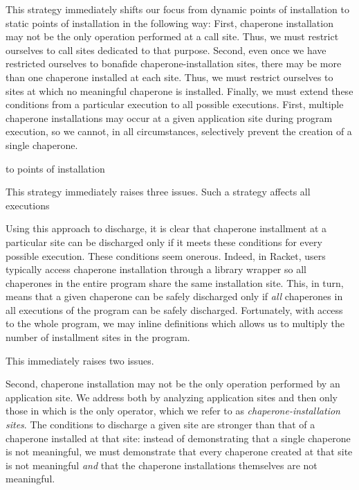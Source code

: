This strategy immediately shifts our focus from dynamic points of installation to static points of installation in the following way:
First, chaperone installation may not be the only operation performed at a call site.
Thus, we must restrict ourselves to call sites dedicated to that purpose.
Second, even once we have restricted ourselves to bonafide chaperone-installation sites, there may be more than one chaperone installed at each site.
Thus, we must restrict ourselves to sites at which no meaningful chaperone is installed.
Finally, we must extend these conditions from a particular execution to all possible executions.
First, multiple chaperone installations may occur at a given application site during program execution, so we cannot, in all circumstances, selectively prevent the creation of a single chaperone.

to points of installation

This strategy immediately raises three issues.
Such a strategy affects all executions

Using this approach to discharge, it is clear that chaperone installment at a particular site can be discharged only if it meets these conditions for every possible execution.
These conditions seem onerous.
Indeed, in Racket, users typically access chaperone installation through a library wrapper so all chaperones in the entire program share the same installation site.
This, in turn, means that a given chaperone can be safely discharged only if \emph{all} chaperones in all executions of the program can be safely discharged.
Fortunately, with access to the whole program, we may inline definitions which allows us to multiply the number of installment sites in the program.

This immediately raises two issues.

Second, chaperone installation may not be the only operation performed by an application site.
We address both by analyzing application sites and then only those in which  is the only operator, which we refer to as \emph{chaperone-installation sites}.
The conditions to discharge a given site are stronger than that of a chaperone installed at that site: instead of demonstrating that a single chaperone is not meaningful, we must demonstrate that every chaperone created at that site is not meaningful \emph{and} that the chaperone installations themselves are not meaningful.


